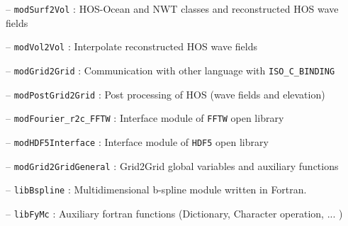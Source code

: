 {
\hspace{0.5 cm} -- \texttt{modSurf2Vol} : HOS-Ocean and NWT classes and reconstructed HOS wave fields

\hspace{0.5 cm} -- \texttt{modVol2Vol} : Interpolate reconstructed HOS wave fields 

\hspace{0.5 cm} -- \texttt{modGrid2Grid} : Communication with other language with \texttt{ISO\_C\_BINDING}

\hspace{0.5 cm} -- \texttt{modPostGrid2Grid} : Post processing of HOS (wave fields and elevation)

\hspace{0.5 cm} -- \texttt{modFourier\_r2c\_FFTW} : Interface module of \texttt{FFTW} open library

\hspace{0.5 cm} -- \texttt{modHDF5Interface} : Interface module of \texttt{HDF5} open library

\hspace{0.5 cm} -- \texttt{modGrid2GridGeneral} : Grid2Grid global variables and auxiliary functions

\hspace{0.5 cm} -- \texttt{libBspline} : Multidimensional b-spline module written in Fortran.

\hspace{0.5 cm} -- \texttt{libFyMc} : Auxiliary fortran functions (Dictionary, Character operation, ... )
}